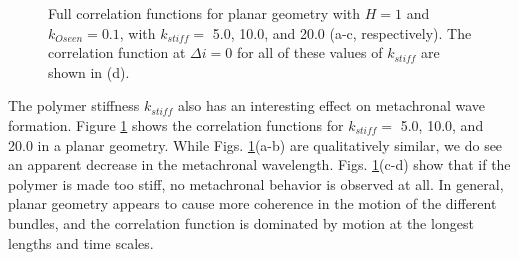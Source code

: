 \documentclass[11pt]{ucthesis}
\begin{document}
\begin{figure}
{}
\qquad
{}
\caption{Full correlation functions for planar geometry with $H=1$
and $k_{Oseen}=0.1$, with $k_{stiff}=$ 5.0, 10.0, and 20.0 (a-c,
respectively). The correlation function at $\Delta i = 0$ for all
of these values of $k_{stiff}$ are shown in (d).  
\label{fig:stiffk}
}
\end{figure}

The polymer stiffness $k_{stiff}$ also has an interesting effect
on metachronal wave formation. Figure \ref{fig:stiffk} shows the
correlation functions for $k_{stiff}=$ 5.0, 10.0, and 20.0 in a
planar geometry. While Figs. \ref{fig:stiffk}(a-b) are qualitatively
similar, we do see an apparent decrease in the metachronal wavelength.
Figs. \ref{fig:stiffk}(c-d) show that if the polymer is made too
stiff, no metachronal behavior is observed at all.
In general, planar geometry appears to cause more coherence in the motion of the different
bundles, and the correlation function is dominated by motion at
the longest lengths and time scales. 
\end{document}
